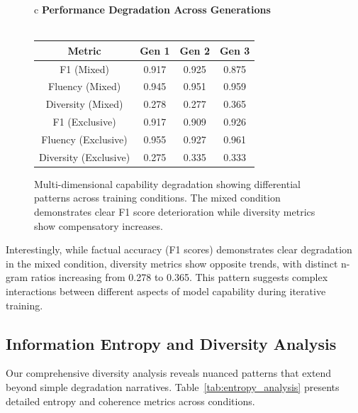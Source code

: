 \documentclass{article}
\begin{document}
\begin{figure}[ht]
\centering
\begin{tabular}{c}
\textbf{Performance Degradation Across Generations} \\
\\
\begin{tabular}{|c|c|c|c|}
\hline
Metric & Gen 1 & Gen 2 & Gen 3 \\
\hline
F1 (Mixed) & 0.917 & 0.925 & 0.875 \\
Fluency (Mixed) & 0.945 & 0.951 & 0.959 \\
Diversity (Mixed) & 0.278 & 0.277 & 0.365 \\
\hline
F1 (Exclusive) & 0.917 & 0.909 & 0.926 \\
Fluency (Exclusive) & 0.955 & 0.927 & 0.961 \\
Diversity (Exclusive) & 0.275 & 0.335 & 0.333 \\
\hline
\end{tabular}
\end{tabular}
\caption{Multi-dimensional capability degradation showing differential patterns across training conditions. The mixed condition demonstrates clear F1 score deterioration while diversity metrics show compensatory increases.}
\label{fig:degradation_curves}
\end{figure}

Interestingly, while factual accuracy (F1 scores) demonstrates clear degradation in the mixed condition, diversity metrics show opposite trends, with distinct n-gram ratios increasing from 0.278 to 0.365. This pattern suggests complex interactions between different aspects of model capability during iterative training.

\subsection{Information Entropy and Diversity Analysis}

Our comprehensive diversity analysis reveals nuanced patterns that extend beyond simple degradation narratives. Table~\ref{tab:entropy_analysis} presents detailed entropy and coherence metrics across conditions.
\end{document}
